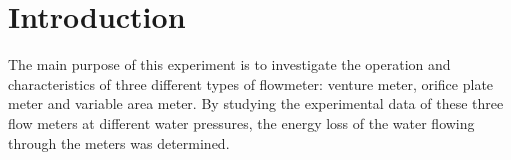 \section{Introduction}
\label{sec:introduction}
\FloatBarrier %
The main purpose of this experiment is to investigate the operation and characteristics of three different
types of flowmeter: venture meter, orifice plate meter and variable area meter.
By studying the experimental data of these three flow meters at different water pressures, 
the energy loss of the water flowing through the meters was determined.
